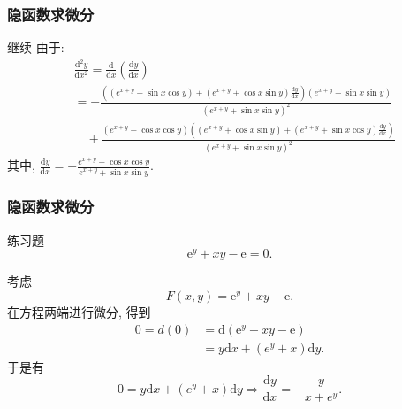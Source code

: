 \documentclass[
10pt,
aspectratio=43,
]{beamer}
\begin{document}
\begin{frame}
	\frametitle{隐函数求微分}
	\everymath{\displaystyle}
	\begin{block}{继续}
		由于:
		$$
			\begin{aligned}
				 & \frac{\mathrm{d}^2y}{\mathrm{d}x^2}=\frac{\mathrm{d}}{\mathrm{d}x}\left(\frac{\mathrm{d}y}{\mathrm{d}x}\right)                                                                                     \\
				 & =-\frac{\left(\left(e^{x+y}+\sin x\cos y\right)+\left(e^{x+y}+\cos x\sin y\right)\frac{\mathrm{d}y}{\mathrm{d}x}\right)\left(e^{x+y}+\sin x\sin y\right)}{\left(e^{x+y}+\sin x\sin y\right)^2}     \\
				 & \quad+\frac{\left(e^{x+y}-\cos x\cos y\right)\left(\left(e^{x+y}+\cos x\sin y\right)+\left(e^{x+y}+\sin x\cos y\right)\frac{\mathrm{d}y}{\mathrm{d}x}\right)}{\left(e^{x+y}+\sin x\sin y\right)^2}
			\end{aligned}
		$$
		其中, $\frac{\mathrm{d}y}{\mathrm{d}x}=-\frac{e^{x+y}-\cos x\cos y}{e^{x+y}+\sin x\sin y}$.
	\end{block}
\end{frame}

\begin{frame}
	\frametitle{隐函数求微分}
	\everymath{\displaystyle}
	\begin{block}{练习题}
		$$
			\mathrm{e}^y+x y-\mathrm{e}=0.
		$$
	\end{block}
	\pause
	\vspace{0.2cm}
	\begin{exampleblock}{}
		考虑
		$$
			F(x,y)= \mathrm{e}^y+x y-\mathrm{e}.
		$$
		\pause
		在方程两端进行微分, 得到
		$$
			\begin{aligned}
				0=d(0) & =\mathrm{d}\left(\mathrm{e}^y+x y-\mathrm{e}\right) \\
				       & =y\mathrm{d}x+(e^y+x)\mathrm{d}y.
			\end{aligned}
		$$
		\pause
		于是有
		$$
			0=y\mathrm{d}x+(e^y+x)\mathrm{d}y\Rightarrow\frac{\mathrm{d}y}{\mathrm{d}x}=-\frac{y}{x+e^y}.
		$$
	\end{exampleblock}
\end{frame}
\end{document}

